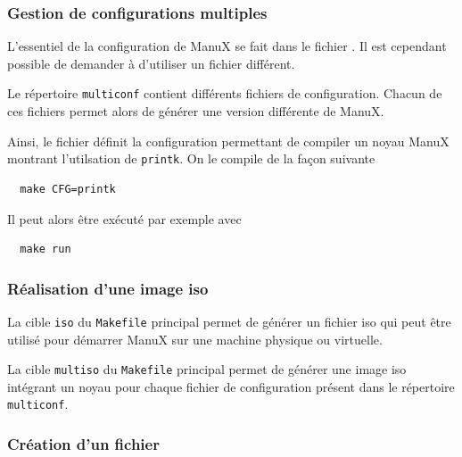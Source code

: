 %
\subsubsection{Gestion de configurations multiples}

   L'essentiel de la configuration de ManuX se fait dans le fichier
. Il est cependant possible de
demander à \make d'utiliser un fichier différent.

   Le répertoire {\tt multiconf} contient différents fichiers de
configuration. Chacun de ces fichiers permet alors de générer une
version différente de ManuX.

   Ainsi, le fichier  définit la
configuration permettant de compiler un noyau ManuX montrant
l'utilsation de {\tt printk}. On le compile de la façon suivante

\begin{lstlisting}
  make CFG=printk
\end{lstlisting}

   Il peut alors être exécuté par exemple avec

\begin{lstlisting}
  make run
\end{lstlisting}

%
\subsubsection{Réalisation d'une image {\sc iso}}

   La cible {\tt iso}  du {\tt Makefile} principal permet de générer
un fichier {\sc iso} qui peut être utilisé pour démarrer ManuX sur une
machine physique ou virtuelle.

   La cible {\tt multiso} du {\tt Makefile} principal permet de
générer une image {\sc iso} intégrant un noyau pour chaque fichier de
configuration présent dans le répertoire {\tt multiconf}.

%
\subsubsection{Création d'un fichier \iso}

